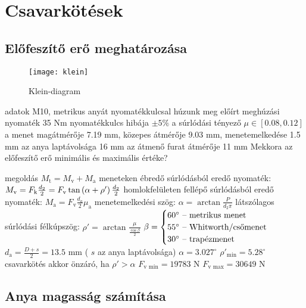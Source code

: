 \section{Csavarkötések}%

\subsection{Előfeszítő erő meghatározása}%
\label{csavarkotes}

\begin{wrapfigure}{r}{.4\textwidth}
 \vspace{-2cm}
 \centering
 \texttt{[image: klein]}
 \caption{Klein-diagram}
\end{wrapfigure}
\parbox{.55\textwidth}{
\begin{outline}
	\1 adatok
		\2 M10, metrikus anyát nyomatékkulcsal húzunk meg
		\2 előírt meghúzási nyomaték 35 Nm
		\2 nyomatékkulcs hibája $\pm 5\%$
		\2 a súrlódási tényező $\mu\in[0.08, 0.12]$
		\2 a menet magátmérője 7.19 mm, közepes átmérője 9.03 mm, menetemelkedése 1.5 mm
		\2 az anya laptávolsága 16 mm
		\2 az átmenő furat átmérője 11 mm
		\2 Mekkora az előfeszítő erő minimális és maximális értéke?\vspace{3mm}
\end{outline}}
\begin{outline}
	\1 megoldás
		\2 $M_\text{t} = M_\text{v} + M_\text{a}$
		\2 meneteken ébredő súrlódásból eredő nyomaték: $M_\text{v} = F_\text{k}\frac{d_2}{2} = F_\text{v}\tan\left(\alpha+\rho'\right)\frac{d_2}{2}$
		\2 homlokfelületen fellépő súrlódásból eredő nyomaték: $M_\text{a} = F_\text{v}\frac{d_a}{2}\mu_\text{a}$
		\2 menetemelkedési szög: $\alpha = \arctan\frac{P}{d_2\pi}$
		\2 látszólagos súrlódási félkúpszög: $\rho' = \arctan\frac{\mu}{\frac{\cos\beta}{2}}$
		\2 $\beta = \begin{cases}60^\circ\text{ -- metrikus menet}\\55^\circ\text{ -- Whitworth/csőmenet}\\30^\circ\text{ -- trapézmenet}\end{cases}$
		\2 $d_\text{a} = \frac{D+s}{2} = 13.5 \text{ mm}$ ( $s$ az anya laptávolsága)
		\2 $\alpha = 3.027^\circ$
		\2 $\rho'_\text{min} = 5.28^\circ$
		\2 csavarkötés akkor önzáró, ha $\rho'>\alpha$
		\2 $F_\text{v min} = 19783$ N
		\2 $F_\text{v max} = 30649$ N
\end{outline}

\subsection{Anya magasság számítása}%

